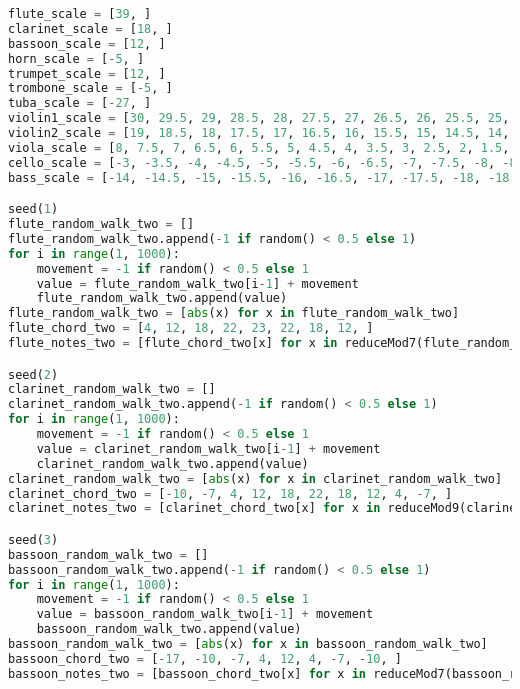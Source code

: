 \begin{lstlisting}[language=Python, caption=Tianshu Segment\_IV]
flute_scale = [39, ]
clarinet_scale = [18, ]
bassoon_scale = [12, ]
horn_scale = [-5, ]
trumpet_scale = [12, ]
trombone_scale = [-5, ]
tuba_scale = [-27, ]
violin1_scale = [30, 29.5, 29, 28.5, 28, 27.5, 27, 26.5, 26, 25.5, 25, 24.5, 24, 23.5, 23, 22.5, 22, 21.5, 21, 20.5, 20, 19.5, 19, 19.5, 20, 20.5, 21, 21.5, 22, 22.5, 23, 23.5, 24, 24.5, 25, 25.5, 26, 26.5, 27, 27.5, 28, 28.5, 29, 29.5, ]
violin2_scale = [19, 18.5, 18, 17.5, 17, 16.5, 16, 15.5, 15, 14.5, 14, 13.5, 13, 12.5, 12, 11.5, 11, 10.5, 10, 9.5, 9, 8.5, 8, 8.5, 9, 9.5, 10, 10.5, 11, 11.5, 12, 12.5, 13, 13.5, 14, 14.5, 15, 15.5, 16, 16.5, 17, 17.5, 18, 18.5, ]
viola_scale = [8, 7.5, 7, 6.5, 6, 5.5, 5, 4.5, 4, 3.5, 3, 2.5, 2, 1.5, 1, 0.5, 0, -0.5, -1, -1.5, -2, -2.5, -3, -2.5, -2, -1.5, -1, -0.5, 0, 0.5, 1, 1.5, 2, 2.5, 3, 3.5, 4, 4.5, 5, 5.5, 6, 6.5, 7, 7.5, ]
cello_scale = [-3, -3.5, -4, -4.5, -5, -5.5, -6, -6.5, -7, -7.5, -8, -8.5, -9, -9.5, -10, -10.5, -11, -11.5, -12, -12.5, -13, -13.5, -14, -13.5, -13, -12.5, -12, -11.5, -11, -10.5, -10, -9.5, -9, -8.5, -8, -7.5, -7, -6.5, -6, -5.5, -5, -4.5, -4, -3.5, ]
bass_scale = [-14, -14.5, -15, -15.5, -16, -16.5, -17, -17.5, -18, -18.5, -19, -19.5, -20, -20.5, -21, -21.5, -22, -22.5, -23, -23.5, -24, -24.5, -25, -24.5, -24, -23.5, -23, -22.5, -22, -21.5, -21, -20.5, -20, -19.5, -19, -18.5, -18, -17.5, -17, -16.5, -16, -15.5, -15, -14.5, ]

seed(1)
flute_random_walk_two = []
flute_random_walk_two.append(-1 if random() < 0.5 else 1)
for i in range(1, 1000):
    movement = -1 if random() < 0.5 else 1
    value = flute_random_walk_two[i-1] + movement
    flute_random_walk_two.append(value)
flute_random_walk_two = [abs(x) for x in flute_random_walk_two]
flute_chord_two = [4, 12, 18, 22, 23, 22, 18, 12, ]
flute_notes_two = [flute_chord_two[x] for x in reduceMod7(flute_random_walk_two)]

seed(2)
clarinet_random_walk_two = []
clarinet_random_walk_two.append(-1 if random() < 0.5 else 1)
for i in range(1, 1000):
    movement = -1 if random() < 0.5 else 1
    value = clarinet_random_walk_two[i-1] + movement
    clarinet_random_walk_two.append(value)
clarinet_random_walk_two = [abs(x) for x in clarinet_random_walk_two]
clarinet_chord_two = [-10, -7, 4, 12, 18, 22, 18, 12, 4, -7, ]
clarinet_notes_two = [clarinet_chord_two[x] for x in reduceMod9(clarinet_random_walk_two)]

seed(3)
bassoon_random_walk_two = []
bassoon_random_walk_two.append(-1 if random() < 0.5 else 1)
for i in range(1, 1000):
    movement = -1 if random() < 0.5 else 1
    value = bassoon_random_walk_two[i-1] + movement
    bassoon_random_walk_two.append(value)
bassoon_random_walk_two = [abs(x) for x in bassoon_random_walk_two]
bassoon_chord_two = [-17, -10, -7, 4, 12, 4, -7, -10, ]
bassoon_notes_two = [bassoon_chord_two[x] for x in reduceMod7(bassoon_random_walk_two)]


\end{lstlisting}

